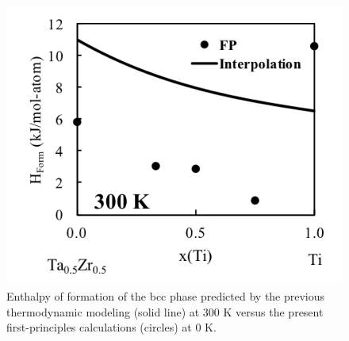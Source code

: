 \newpage
\begin{figure}[H]
	\centering
	\includegraphics{Chapter-3/Figures/TiTaZr2.png}
	\caption{Enthalpy of formation of the bcc phase predicted by the previous thermodynamic modeling (solid line) at 300 K versus the present first-principles calculations (circles) at 0 K.}
	\label{Ch3-figure:TiTaZr2}
\end{figure}
